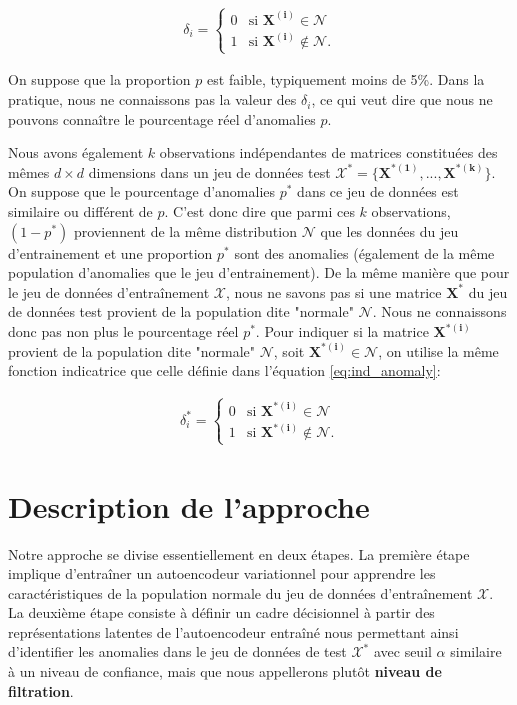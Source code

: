 \begin{gather}  \label{eq:ind_anomaly}
\delta_{i}=
\begin{cases}
0 & \text{si $\boldsymbol{X^{(i)}}\in\mathcal{N}$} \\
1 & \text{si $\boldsymbol{X^{(i)}}\not\in\mathcal{N}$}.
\end{cases}
\end{gather}

On suppose que la proportion $p$ est faible, typiquement moins de 5\%. Dans la pratique, nous ne connaissons pas la valeur des $\delta_i$, ce qui veut dire que nous ne pouvons connaître le pourcentage réel d'anomalies $p$. 

Nous avons également $k$ observations indépendantes de matrices constituées des mêmes $d \times d$ dimensions dans un jeu de données test $\mathcal{X^*} = \{\boldsymbol{X^{*(1)}},...,\boldsymbol{X^{*(k)}}\}$. On suppose que le pourcentage d'anomalies $p^*$ dans ce jeu de données est similaire ou différent de $p$. C'est donc dire que parmi ces $k$ observations, $(1-p^*)$ proviennent de la même distribution $\mathcal{N}$ que les données du jeu d'entrainement et une proportion $p^*$ sont des anomalies (également de la même population d'anomalies que le jeu d'entrainement). De la même manière que pour le jeu de données d'entraînement $\mathcal{X}$, nous ne savons pas si une matrice $\boldsymbol{X^{*}}$ du jeu de données test provient de la population dite "normale" $\mathcal{N}$. Nous ne connaissons donc pas non plus le pourcentage réel $p^*$. Pour indiquer si la matrice $\boldsymbol{X^{*(i)}}$ provient de la population dite "normale" $\mathcal{N}$, soit $ \boldsymbol{X^{*(i)}}\in\mathcal{N}$, on utilise la même fonction indicatrice que celle définie dans l'équation \ref{eq:ind_anomaly}:

\begin{gather}  \label{eq:ind_anomaly}
\delta^{*}_{i}=
\begin{cases}
0 & \text{si $\boldsymbol{X^{*(i)}}\in\mathcal{N}$} \\
1 & \text{si $\boldsymbol{X^{*(i)}}\not\in\mathcal{N}$}.
\end{cases}
\end{gather}


\section{Description de l'approche}

Notre approche se divise essentiellement en deux étapes. La première étape implique d'entraîner un autoencodeur variationnel pour apprendre les caractéristiques de la population normale du jeu de données d'entraînement $\mathcal{X}$. La deuxième étape consiste à définir un cadre décisionnel à partir des représentations latentes de l'autoencodeur entraîné nous permettant ainsi d'identifier les anomalies dans le jeu de données de test $\mathcal{X^*}$ avec seuil $\alpha$ similaire à un niveau de confiance, mais que nous appellerons plutôt \textbf{niveau de filtration}.

